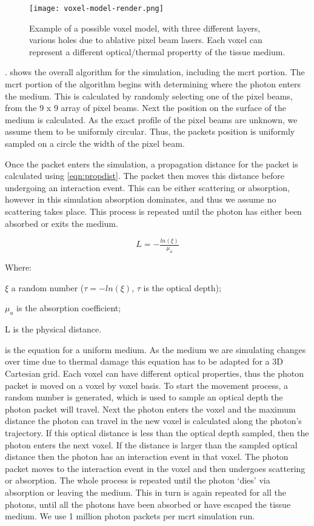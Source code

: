 \begin{figure}
\centering
\texttt{[image: voxel-model-render.png]}
\caption{Example of a possible voxel model, with three different layers, various holes due to ablative pixel beam lasers. Each voxel can represent a different optical/thermal propertty of the tissue medium.}\label{fig:voxel-model}
\end{figure}

. shows the overall algorithm for the simulation, including the \gls{mcrt} portion. 
The \gls{mcrt} portion of the algorithm begins with determining where the photon enters the medium. This is calculated by randomly selecting one of the pixel beams, from the 9 x 9 array of pixel beams. Next the position on the surface of the medium is calculated. As the exact profile of the pixel beams are unknown, we assume them to be uniformly circular. Thus, the packets position is uniformly sampled on a circle the width of the pixel beam.

Once the packet enters the simulation, a propagation distance for the packet is calculated using \cref{eqn:propdist}. The packet then moves this distance before undergoing an interaction event. This can be either scattering or absorption, however in this simulation absorption dominates, and thus we assume no scattering takes place. This process is repeated until the photon has either been absorbed or exits the medium.

\begin{equation}
L = -\tfrac{ln(\xi)}{\mu_a}
\label{eqn:propdist}
\end{equation}

\noindent Where:

\indent $\xi$ a random number ($\tau = -ln(\xi)$, $\tau$ is the optical depth);

\indent $\mu_a$ is the absorption coefficient;

\indent L is the physical distance.

\medskip

 is the equation for a uniform medium. As the medium we are simulating changes over time due to thermal damage this equation has to be adapted for a 3D Cartesian grid. Each voxel 
can have different optical properties, thus the photon packet is moved on a voxel by voxel basis. To start the movement process, a random number is generated, which is used to sample an optical depth the photon packet will travel. Next the photon enters the voxel and the maximum distance the photon can travel in the new voxel is calculated along the photon's trajectory. If this optical distance is less than the optical depth sampled, then the photon enters the next voxel. If the distance is larger than the sampled optical distance then the photon has an interaction event in that voxel. The photon packet moves to the interaction event in the voxel and then undergoes scattering or absorption. The whole process is repeated until the photon `dies' via absorption or leaving the medium.
This in turn is again repeated for all the photons, until all the photons have been absorbed or have escaped the tissue medium. We use 1 million photon packets per \gls{mcrt} simulation run.

